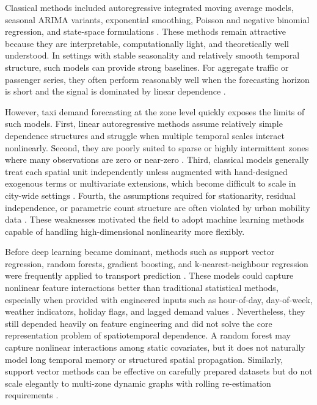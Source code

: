 \documentclass[12pt,a4paper]{report}
\begin{document}
Classical methods included autoregressive integrated moving average models, seasonal ARIMA variants, exponential smoothing, Poisson and negative binomial regression, and state-space formulations \cite{petropoulos2020forecasting,lyu2021bigdata}. These methods remain attractive because they are interpretable, computationally light, and theoretically well understood. In settings with stable seasonality and relatively smooth temporal structure, such models can provide strong baselines. For aggregate traffic or passenger series, they often perform reasonably well when the forecasting horizon is short and the signal is dominated by linear dependence \cite{petropoulos2020forecasting}.

However, taxi demand forecasting at the zone level quickly exposes the limits of such models. First, linear autoregressive methods assume relatively simple dependence structures and struggle when multiple temporal scales interact nonlinearly. Second, they are poorly suited to sparse or highly intermittent zones where many observations are zero or near-zero \cite{zhuang2022sparse}. Third, classical models generally treat each spatial unit independently unless augmented with hand-designed exogenous terms or multivariate extensions, which become difficult to scale in city-wide settings \cite{jiang2022survey,safikhani2017nyc}. Fourth, the assumptions required for stationarity, residual independence, or parametric count structure are often violated by urban mobility data \cite{lyu2021bigdata}. These weaknesses motivated the field to adopt machine learning methods capable of handling high-dimensional nonlinearity more flexibly.

Before deep learning became dominant, methods such as support vector regression, random forests, gradient boosting, and k-nearest-neighbour regression were frequently applied to transport prediction \cite{medina2022review,roy2025transferability}. These models could capture nonlinear feature interactions better than traditional statistical methods, especially when provided with engineered inputs such as hour-of-day, day-of-week, weather indicators, holiday flags, and lagged demand values \cite{roy2025transferability,lyu2021bigdata}. Nevertheless, they still depended heavily on feature engineering and did not solve the core representation problem of spatiotemporal dependence. A random forest may capture nonlinear interactions among static covariates, but it does not naturally model long temporal memory or structured spatial propagation. Similarly, support vector methods can be effective on carefully prepared datasets but do not scale elegantly to multi-zone dynamic graphs with rolling re-estimation requirements \cite{jiang2022survey,medina2022review}.
\end{document}
